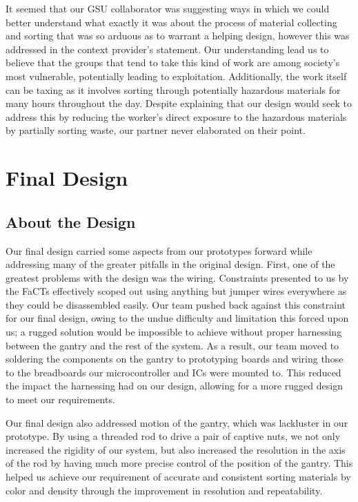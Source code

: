 \documentclass[12pt]{article}
\begin{document}
\begin{multicols*}{2}
            It seemed that our GSU collaborator was suggesting ways in which we could better understand what exactly it was about the process of material collecting and sorting that was so arduous as to warrant a helping design, however this was addressed in the context provider's statement. Our understanding lead us to believe that the groups that tend to take this kind of work are among society's most vulnerable, potentially leading to exploitation. Additionally, the work itself can be taxing as it involves sorting through potentially hazardous materials for many hours throughout the day. Despite explaining that our design would seek to address this by reducing the worker's direct exposure to the hazardous materials by partially sorting waste, our partner never elaborated on their point. 
            
    \section{Final Design}

        \subsection{About the Design}
            Our final design carried some aspects from our prototypes forward while addressing many of the greater pitfalls in the original design. First, one of the greatest problems with the design was the wiring. Constraints presented to us by the FaCTs effectively scoped out using anything but jumper wires everywhere as they could be disassembled easily. Our team pushed back against this constraint for our final design, owing to the undue difficulty and limitation this forced upon us; a rugged solution would be impossible to achieve without proper harnessing between the gantry and the rest of the system. As a result, our team moved to soldering the components on the gantry to prototyping boards and wiring those to the breadboards our microcontroller and ICs were mounted to. This reduced the impact the harnessing had on our design, allowing for a more rugged design to meet our requirements. 

            Our final design also addressed motion of the gantry, which was lackluster in our prototype. By using a threaded rod to drive a pair of captive nuts, we not only increased the rigidity of our system, but also increased the resolution in the axis of the rod by having much more precise control of the position of the gantry. This helped us achieve our requirement of accurate and consistent sorting materials by color and density through the improvement in resolution and repeatability.


\end{multicols*}
\end{document}
